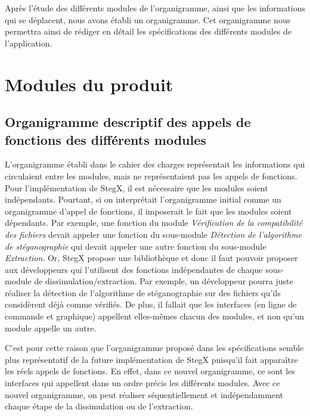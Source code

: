 \documentclass[11pt]{article}
\begin{document}
Après l'étude des différents modules de l'organigramme, ainsi que les informations 
qui se déplacent, nous avons établi un organigramme. 
Cet organigramme nous permettra ainsi de rédiger en détail les spécifications 
des différents modules de l'application. 

\section{Modules du produit}


\subsection{Organigramme descriptif des appels de fonctions des différents 
modules}

L'organigramme établi dans le cahier des charges représentait les informations
qui circulaient entre les modules, mais ne représentaient pas les appels de
fonctions. Pour l'implémentation de StegX, il est nécessaire que les modules
soient indépendants. Pourtant, si on interprétait l’organigramme initial comme
un organigramme d’appel de fonctions, il imposerait le fait que les modules
soient dépendants. Par exemple, une fonction du module \textit{Vérification de
la compatibilité des fichiers} devait appeler une fonction du sous-module
\textit{Détection de l'algorithme de stéganographie} qui devait appeler une
autre fonction du sous-module \textit{Extraction}. Or, StegX propose une
bibliothèque et donc il faut pouvoir proposer aux développeurs qui l'utilisent
des fonctions indépendantes de chaque sous-module de dissimulation/extraction.
Par exemple, un développeur pourra juste réaliser la détection de l'algorithme
de stéganographie sur des fichiers qu'ils considèrent déjà comme vérifiés. De
plus, il fallait que les interfaces (en ligne de commande et graphique)
appellent elles-mêmes chacun des modules, et non qu'un module appelle un autre. 

C'est pour cette raison que l'organigramme proposé dans les spécifications
semble plus représentatif de la future implémentation de StegX puisqu'il fait
apparaître les réels appels de fonctions. En effet, dans ce nouvel organigramme,
ce sont les interfaces qui appellent dans un ordre précis les différents
modules. Avec ce nouvel organigramme, on peut réaliser séquentiellement et
indépendamment chaque étape de la dissimulation ou de l'extraction. 
\end{document}
